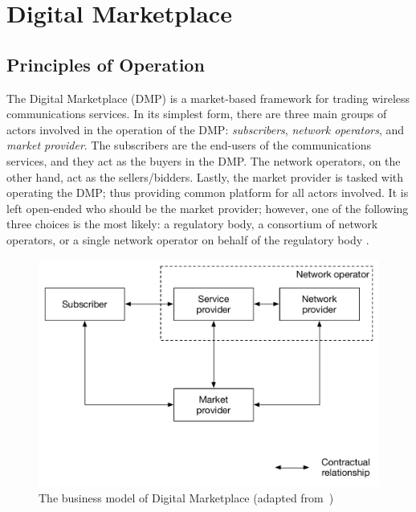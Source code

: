 \chapter{Digital Marketplace} %
\label{cha:dmp}

\minitoc
\vspace{10mm}

\section{Principles of Operation} %
\label{sec:principles_of_operation_dmp}
The Digital Marketplace (DMP) is a market-based framework for trading wireless communications services. In its simplest form, there are three main groups of actors involved in the operation of the DMP: \emph{subscribers}, \emph{network operators}, and \emph{market provider}. The subscribers are the end-users of the communications services, and they act as the buyers in the DMP. The network operators, on the other hand, act as the sellers/bidders. Lastly, the market provider is tasked with operating the DMP; thus providing common platform for all actors involved. It is left open-ended who should be the market provider; however, one of the following three choices is the most likely: a regulatory body, a consortium of network operators, or a single network operator on behalf of the regulatory body \cite{DMIrvine02}.

\begin{figure}[t]
	\includegraphics[width=\figsize]{DMP/Figures/dmp_model}
	\caption{The business model of Digital Marketplace (adapted from~\cite{DMIrvine02})}
	\label{fig:dmp_model_dmp}
\end{figure}

